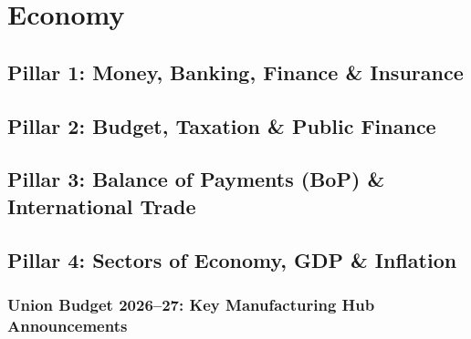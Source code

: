 \chapter{Economy}
\section{Pillar 1: Money, Banking, Finance \& Insurance}
\section{Pillar 2: Budget, Taxation \& Public Finance}

\section{Pillar 3: Balance of Payments (BoP) \& International Trade}



\section{Pillar 4: Sectors of Economy, GDP \& Inflation}

\subsection{Union Budget 2026--27: Key Manufacturing Hub Announcements}

